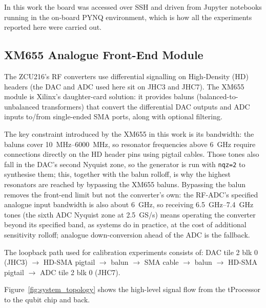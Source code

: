 In this work the board was accessed over SSH and driven from Jupyter notebooks
running in the on-board PYNQ environment, which is how all the experiments
reported here were carried out.

\subsection{XM655 Analogue Front-End Module}
\label{subsec:xm655}

The ZCU216's RF converters use differential signalling on High-Density (HD)
headers (the DAC and ADC used here sit on JHC3 and JHC7).  The XM655 module is Xilinx's daughter-card
solution: it provides baluns (balanced-to-unbalanced transformers) that convert the
differential DAC outputs and ADC inputs to/from single-ended SMA ports, along with
optional filtering.

The key constraint introduced by the XM655 in this work is its bandwidth: the
baluns cover \SIrange{10}{6000}{\mega\hertz}, so resonator frequencies above
\SI{6}{\giga\hertz} require connections directly on the HD header pins using pigtail
cables.  Those tones also fall in the DAC's second Nyquist zone, so the generator is
run with \texttt{nqz=2} to synthesise them; this, together with the balun rolloff,
is why the highest resonators are reached by bypassing the XM655 baluns.  Bypassing
the balun removes the front-end limit but not the converter's own: the RF-ADC's
specified analogue input bandwidth is also about \SI{6}{\giga\hertz}, so receiving
\SIrange{6.5}{7.4}{\giga\hertz} tones (the sixth ADC Nyquist zone at
\SI{2.5}{GS/s}) means operating the converter beyond its specified band, as
\QICK{} systems do in practice, at the cost of additional sensitivity rolloff;
analogue down-conversion ahead of the ADC is the fallback.

The loopback path used for calibration experiments consists of:
DAC tile 2 blk 0 (JHC3) $\to$ HD-SMA pigtail $\to$ balun $\to$ SMA cable
$\to$ balun $\to$ HD-SMA pigtail $\to$ ADC tile 2 blk 0 (JHC7).

Figure~\ref{fig:system_topology} shows the high-level signal flow from the
tProcessor to the qubit chip and back.


